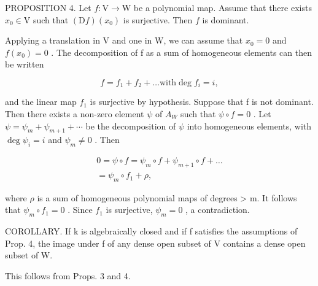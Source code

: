 PROPOSITION 4. Let \(f: \mathrm{V} \to \mathrm{W}\) be a polynomial map. Assume that there exists \(x_0 \in \mathrm{V}\) such that \((\mathrm{D}f)(x_0)\) is surjective. Then \(f\) is dominant.

Applying a translation in V and one in W, we can assume that \(x_{0} = 0\) and \(f(x_{0}) = 0\) . The decomposition of f as a sum of homogeneous elements can then be written

\[
f = f _ {1} + f _ {2} + \dots \text {with} \deg f _ {i} = i,
\]

and the linear map \(f_{1}\) is surjective by hypothesis. Suppose that f is not dominant. Then there exists a non-zero element \(\psi\) of \(A_{W}\) such that \(\psi \circ f = 0\) . Let \(\psi = \psi_{m} + \psi_{m+1} + \cdots\) be the decomposition of \(\psi\) into homogeneous elements, with \(\deg \psi_{i} = i\) and \(\psi_{m} \neq 0\) . Then

\[
\begin{array}{l} 0 = \psi \circ f = \psi_ {m} \circ f + \psi_ {m + 1} \circ f + \dots \\ = \psi_ {m} \circ f _ {1} + \rho , \end{array}
\]

where \(\rho\) is a sum of homogeneous polynomial maps of degrees \textgreater{} m. It follows that \(\psi_{m} \circ f_{1} = 0\) . Since \(f_{1}\) is surjective, \(\psi_{m} = 0\) , a contradiction.

COROLLARY. If k is algebraically closed and if f satisfies the assumptions of Prop. 4, the image under f of any dense open subset of V contains a dense open subset of W.

This follows from Props. 3 and 4.
\relax{}
